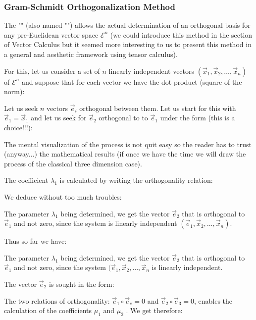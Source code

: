 	\subsubsection{Gram-Schmidt Orthogonalization Method}
	The "\label{gram-schmidt procedure}" (also named "") allows the actual determination of an orthogonal basis for any pre-Euclidean vector space $\mathcal{E}^n$ (we could introduce this method in the section of Vector Calculus but it seemed more interesting to us to present this method in a general and aesthetic framework using tensor calculus).
	
	For this, let us consider a set of $n$ linearly independent vectors $(\vec{x}_1,\vec{x}_2,\ldots,\vec{x}_n)$ of $\mathcal{E}^n$ and suppose that for each vector we have the dot product (square of the norm):
	
	Let us seek $n$ vectors $\vec{e}_i$ orthogonal between them. Let us start for this with $\vec{e}_1=\vec{x}_1$ and let us seek for $\vec{e}_2$ orthogonal to to $\vec{e}_1$ under the form (this is a choice!!!):
	
	The mental visualization of the process is not quit easy so the reader has to trust (anyway...) the mathematical results (if once we have the time we will draw the process of the classical three dimension case).
	
	The coefficient $\lambda_1$ is calculated by writing the orthogonality relation:
	
	We deduce without too much troubles:
	
	The parameter $\lambda_1$ being determined, we get the vector $\vec{e}_2$ that is orthogonal to $\vec{e}_1$ and not zero, since the system is linearly independent $(\vec{e}_1,\vec{x}_2,\ldots,\vec{x}_n)$.
	
	Thus so far we have:
	
	The parameter $\lambda_1$ being determined, we get the vector $\vec{e}_2$ that is orthogonal to $\vec{e}_1$ and not zero, since the system $(\vec{e}_1,\vec{x}_2,\ldots,\vec{x}_n$ is linearly independent.
	
	The vector $\vec{e}_2$ is sought in the form:
	
	The two relations of orthogonality: $\vec{e}_1\circ\vec{e}_e=0$ and $\vec{e}_2\circ\vec{e}_3=0$, enables the calculation of the coefficients $\mu_1$ and $\mu_2$ . We get therefore:
	

